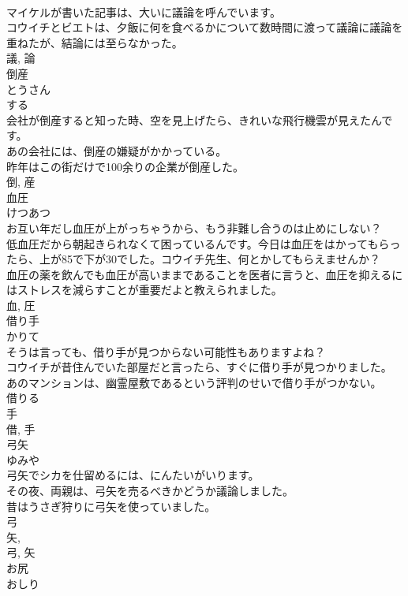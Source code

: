 \documentclass[8pt]{extreport}
\begin{document}
\begin{CJK}{UTF8}{min}
\\	マイケルが書いた記事は、大いに議論を呼んでいます。	
\\	コウイチとビエトは、夕飯に何を食べるかについて数時間に渡って議論に議論を重ねたが、結論には至らなかった。	
\\	議, 論	
\\	倒産	
\\	とうさん	
\\	する 
\\	会社が倒産すると知った時、空を見上げたら、きれいな飛行機雲が見えたんです。	
\\	あの会社には、倒産の嫌疑がかかっている。	
\\	昨年はこの街だけで100余りの企業が倒産した。	
\\	倒, 産	
\\	血圧	
\\	けつあつ	
\\	お互い年だし血圧が上がっちゃうから、もう非難し合うのは止めにしない？	
\\	低血圧だから朝起きられなくて困っているんです。今日は血圧をはかってもらったら、上が85で下が30でした。コウイチ先生、何とかしてもらえませんか？	
\\	血圧の薬を飲んでも血圧が高いままであることを医者に言うと、血圧を抑えるにはストレスを減らすことが重要だよと教えられました。	
\\	血, 圧	
\\	借り手	
\\	かりて	
\\	そうは言っても、借り手が見つからない可能性もありますよね？	
\\	コウイチが昔住んでいた部屋だと言ったら、すぐに借り手が見つかりました。	
\\	あのマンションは、幽霊屋敷であるという評判のせいで借り手がつかない。	
\\	借りる 
\\	手 
\\	借, 手	
\\	弓矢	
\\	ゆみや	
\\	弓矢でシカを仕留めるには、にんたいがいります。	
\\	その夜、両親は、弓矢を売るべきかどうか議論しました。	
\\	昔はうさぎ狩りに弓矢を使っていました。	
\\	弓 
\\	矢, 
\\	弓, 矢	
\\	お尻	
\\	おしり	

\end{CJK}
\end{document}
